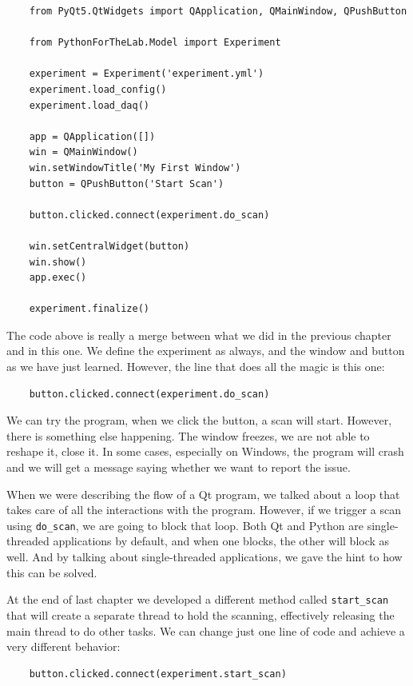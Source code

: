 \begin{verbatim}
    from PyQt5.QtWidgets import QApplication, QMainWindow, QPushButton

    from PythonForTheLab.Model import Experiment

    experiment = Experiment('experiment.yml')
    experiment.load_config()
    experiment.load_daq()

    app = QApplication([])
    win = QMainWindow()
    win.setWindowTitle('My First Window')
    button = QPushButton('Start Scan')

    button.clicked.connect(experiment.do_scan)

    win.setCentralWidget(button)
    win.show()
    app.exec()

    experiment.finalize()
\end{verbatim}

The code above is really a merge between what we did in the previous chapter and in this one. We define the experiment as always, and the window and button as we have just learned. However, the line that does all the magic is this one:

\begin{verbatim}
    button.clicked.connect(experiment.do_scan)
\end{verbatim}

We can try the program, when we click the button, a scan will start. However, there is something else happening. The window freezes, we are not able to reshape it, close it. In some cases, especially on Windows, the program will crash and we will get a message saying whether we want to report the issue.


When we were describing the flow of a Qt program, we talked about a loop that takes care of all the interactions with the program. However, if we trigger a scan using \texttt{do\_scan}, we are going to block that loop. Both Qt and Python are single-threaded applications by default, and when one blocks, the other will block as well. And by talking about single-threaded applications, we gave the hint to how this can be solved.

At the end of last chapter we developed a different method called \texttt{start\_scan} that will create a separate thread to hold the scanning, effectively releasing the main thread to do other tasks. We can change just one line of code and achieve a very different behavior:

\begin{verbatim}
    button.clicked.connect(experiment.start_scan)
\end{verbatim}

